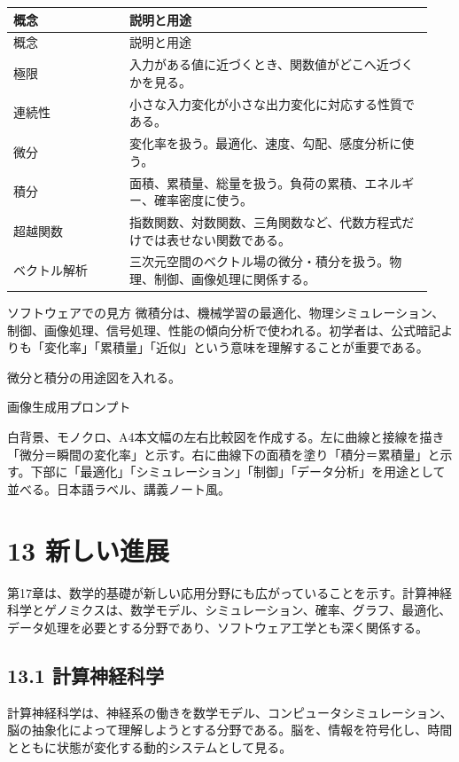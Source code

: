 \documentclass[uplatex,dvipdfmx,a4paper,10pt]{jsarticle}
\begin{document}
\begin{longtable}{>{\raggedright\arraybackslash}p{0.26\linewidth} >{\raggedright\arraybackslash}p{0.68\linewidth}}
\toprule
概念 & 説明と用途 \\
\midrule
\endfirsthead
\toprule
概念 & 説明と用途 \\
\midrule
\endhead
極限 & 入力がある値に近づくとき、関数値がどこへ近づくかを見る。 \\
連続性 & 小さな入力変化が小さな出力変化に対応する性質である。 \\
微分 & 変化率を扱う。最適化、速度、勾配、感度分析に使う。 \\
積分 & 面積、累積量、総量を扱う。負荷の累積、エネルギー、確率密度に使う。 \\
超越関数 & 指数関数、対数関数、三角関数など、代数方程式だけでは表せない関数である。 \\
ベクトル解析 & 三次元空間のベクトル場の微分・積分を扱う。物理、制御、画像処理に関係する。 \\
\bottomrule
\end{longtable}
\begin{infobox}{ソフトウェアでの見方}
微積分は、機械学習の最適化、物理シミュレーション、制御、画像処理、信号処理、性能の傾向分析で使われる。初学者は、公式暗記よりも「変化率」「累積量」「近似」という意味を理解することが重要である。
\end{infobox}
\begin{todobox}
微分と積分の用途図を入れる。

画像生成用プロンプト

白背景、モノクロ、A4本文幅の左右比較図を作成する。左に曲線と接線を描き「微分＝瞬間の変化率」と示す。右に曲線下の面積を塗り「積分＝累積量」と示す。下部に「最適化」「シミュレーション」「制御」「データ分析」を用途として並べる。日本語ラベル、講義ノート風。
\end{todobox}
\section{13 新しい進展}
第17章は、数学的基礎が新しい応用分野にも広がっていることを示す。計算神経科学とゲノミクスは、数学モデル、シミュレーション、確率、グラフ、最適化、データ処理を必要とする分野であり、ソフトウェア工学とも深く関係する。

\subsection{13.1 計算神経科学}
計算神経科学は、神経系の働きを数学モデル、コンピュータシミュレーション、脳の抽象化によって理解しようとする分野である。脳を、情報を符号化し、時間とともに状態が変化する動的システムとして見る。
\end{document}

